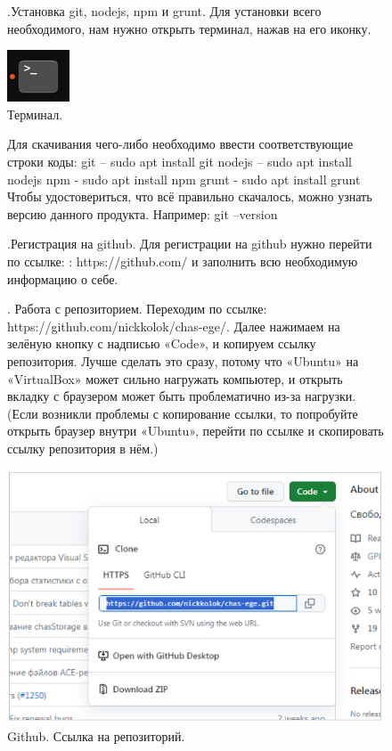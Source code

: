 \begin{figure}
.\quad Установка git, nodejs, npm и grunt.
\newline Для установки всего необходимого, нам нужно открыть терминал, нажав на его иконку.

		\centering
		\includegraphics[width=0.1\linewidth]{img/5.png}
\caption{Терминал.}
\label{ris:image}
\end{figure}

\begin{figure}
\quad Для скачивания чего-либо необходимо ввести соответствующие строки коды:
\newline git – sudo apt install git
\newline nodejs – sudo apt install nodejs
\newline npm - sudo apt install npm
\newline grunt - sudo apt install grunt
\newline Чтобы удостовериться, что всё правильно скачалось, можно узнать версию данного продукта. Например: git –version
\end{figure}

\begin{figure}
.\quad  Регистрация на github.
\newline \quad Для регистрации на github нужно перейти по ссылке: : https://github.com/ и заполнить всю необходимую информацию о себе.
\end{figure}

\begin{figure}
. \quad Работа с репозиторием.
\newline \quad Переходим по ссылке: https://github.com/nickkolok/chas-ege/. Далее нажимаем на зелёную кнопку с надписью «Code», и копируем ссылку репозитория. Лучше сделать это сразу, потому что «Ubuntu» на «VirtualBox» может сильно нагружать компьютер, и открыть вкладку с браузером может быть проблематично из-за нагрузки. (Если возникли проблемы с копирование ссылки, то попробуйте открыть браузер внутри «Ubuntu», перейти по ссылке и скопировать ссылку репозитория в нём.)

		\centering
		\includegraphics[width=0.65\linewidth]{img/6.png}
\caption{Github. Ссылка на репозиторий.}
\label{ris:image}
\end{figure}

